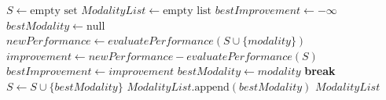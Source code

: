 \begin{algorithm}[H]

\caption{Greedy Algorithm for Ranking Modalities}
\begin{algorithmic}

    \State $S \gets \text{empty set}$
    \State $ModalityList \gets \text{empty list}$
        \State $bestImprovement \gets -\infty$
        \State $bestModality \gets \text{null}$
            \State $newPerformance \gets evaluatePerformance(S \cup \{modality\})$
            \State $improvement \gets newPerformance - evaluatePerformance(S)$
                \State $bestImprovement \gets improvement$
                \State $bestModality \gets modality$
            \EndIf
        \EndFor
            \State \textbf{break}
        \EndIf
        \State $S \gets S \cup \{bestModality\}$
        \State $ModalityList.\text{append}(bestModality)$
    \EndWhile
    \State \Return $ModalityList$
\EndFunction

\end{algorithmic}
\end{algorithm}